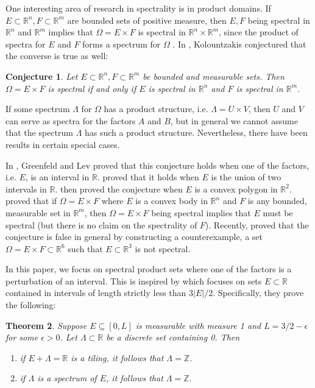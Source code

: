 \documentclass{amsart}
\newtheorem{theorem}{Theorem}[section]
\newtheorem{conjecture}[theorem]{Conjecture}
\newcommand{\R}{\mathbb{R}}
\begin{document}
One interesting area of research in spectrality is in product domains. If $E \subset \R^n, F \subset \R^m$ are bounded sets of positive measure, then $E, F$ being spectral in $\R^n$ and $\R^m$ implies that $\Omega = E \times F$ is spectral in $\R^n \times \R^m$, since the product of spectra for $E$ and $F$ forms a spectrum for $\Omega$ \cite{Kol24}. In \cite{K16}, Kolountzakis conjectured that the converse is true as well: 

\begin{conjecture}
    Let $E \subset \R^n, F \subset \R^m$ be bounded and measurable sets. Then $\Omega = E \times F$ is spectral if and only if $E$ is spectral in $\R^n$ and $F$ is spectral in $\R^m$. 
\end{conjecture} 

If some spectrum $\Lambda$ for $\Omega$ has a product structure, i.e. $\Lambda = U \times V$, then $U$ and $V$ can serve as spectra for the factors $A$ and $B$, but in general we cannot assume that the spectrum $\Lambda$ has such a product structure. Nevertheless, there have been results in certain special cases. 

In \cite{GL16}, Greenfeld and Lev proved that this conjecture holds when one of the factors, i.e. $E$, is an interval in $\R$. \cite{K16} proved that it holds when $E$ is the union of two intervals in $\R$. \cite{GL20} then proved the conjecture when $E$ is a convex polygon in $\R^2$. \cite{KLM} proved that if $\Omega = E \times F$ where $E$ is a convex body in $\R^n$ and $F$ is any bounded, measurable set in $\R^m$, then $\Omega = E \times F$ being spectral implies that $E$ must be spectral (but there is no claim on the spectrality of $F$). Recently, \cite{Som24} proved that the conjecture is false in general by constructing a counterexample, a set $\Omega = E \times F \subset \R^6$ such that $E \subset \R^3$ is not spectral. 

In this paper, we focus on spectral product sets where one of the factors is a perturbation of an interval. This is inspired by \cite{KL02} which focuses on sets $E \subset \R$ contained in intervals of length strictly less than $3|E|/2$. Specifically, they prove the following: 

\begin{theorem}
Suppose $E \subseteq [0,L]$ is measurable with measure 1 and $L = 3/2 - \epsilon$ for some $\epsilon > 0$. Let $\Lambda \subset \mathbb{R}$ be a discrete set containing 0. Then
\begin{enumerate}
    \item[(a)] if $E+\Lambda = \mathbb{R}$ is a tiling, it follows that $\Lambda = \mathbb{Z}$.
    \item[(b)] if $\Lambda$ is a spectrum of $E$, it follows that $\Lambda = \mathbb{Z}$.
\end{enumerate}
\label{thm_KL}
\end{theorem} 
\end{document}

